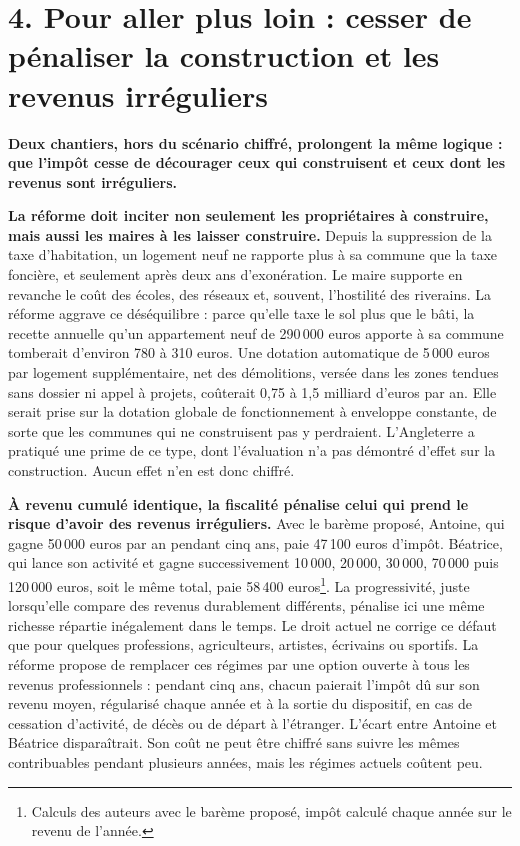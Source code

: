 \documentclass[10pt,a4paper]{article}
\begin{document}
\section{4. Pour aller plus loin : cesser de pénaliser la construction et les revenus irréguliers}

\textbf{Deux chantiers, hors du scénario chiffré, prolongent la même logique : que l'impôt cesse de décourager ceux
qui construisent et ceux dont les revenus sont irréguliers.}

\textbf{La réforme doit inciter non seulement les propriétaires à construire, mais aussi les maires à les laisser
construire.} Depuis la suppression de la taxe d'habitation, un logement neuf ne rapporte plus à sa commune que la taxe
foncière, et seulement après deux ans d'exonération. Le maire supporte en revanche le coût des écoles, des réseaux et,
souvent, l'hostilité des riverains. La réforme aggrave ce déséquilibre : parce qu'elle taxe le sol plus que le bâti,
la recette annuelle qu'un appartement neuf de 290\,000 euros apporte à sa commune tomberait d'environ 780 à 310 euros.
Une dotation automatique de 5\,000 euros par logement supplémentaire, net des démolitions, versée dans les zones
tendues sans dossier ni appel à projets, coûterait 0,75 à 1,5 milliard d'euros par an. Elle serait prise sur la dotation
globale de fonctionnement à enveloppe constante, de sorte que les communes qui ne construisent pas y perdraient.
L'Angleterre a pratiqué une prime de ce type, dont l'évaluation n'a pas démontré d'effet sur la construction. Aucun effet n'en
est donc chiffré.

\textbf{À revenu cumulé identique, la fiscalité pénalise celui qui prend le risque d'avoir des revenus irréguliers.}
Avec le barème proposé, Antoine, qui gagne 50\,000 euros par an pendant cinq ans, paie 47\,100 euros d'impôt. Béatrice, qui
lance son activité et gagne successivement 10\,000, 20\,000, 30\,000, 70\,000 puis 120\,000 euros, soit le même total,
paie 58\,400 euros\footnote{Calculs des auteurs avec le barème proposé, impôt calculé chaque année sur le revenu de l'année.}. La progressivité, juste lorsqu'elle compare des revenus durablement différents, pénalise ici une
même richesse répartie inégalement dans le temps. Le droit actuel ne corrige ce défaut que pour quelques professions,
agriculteurs, artistes, écrivains ou sportifs. La réforme propose de remplacer ces régimes par une option ouverte à tous les
revenus professionnels : pendant cinq ans, chacun paierait l'impôt dû sur son revenu moyen, régularisé chaque année et à
la sortie du dispositif, en cas de cessation d'activité, de décès ou de départ à l'étranger. L'écart entre Antoine et
Béatrice disparaîtrait. Son coût ne peut être chiffré sans suivre les mêmes contribuables pendant plusieurs années, mais
les régimes actuels coûtent peu.
\end{document}
